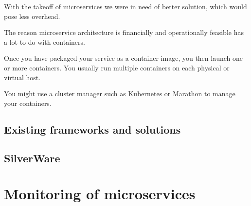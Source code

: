 \documentclass[12pt,oneside]{fithesis2}
\begin{document}
With the takeoff of microservices we were in need of better solution, which would pose less overhead.

The reason microservice architecture is financially and operationally feasible has a lot to do with containers.

Once you have packaged your service as a container image, you then launch one or more containers. You usually run multiple containers on each physical or virtual host.

You might use a cluster manager such as Kubernetes or Marathon to manage your containers.

\section{Existing frameworks and solutions}

\section{SilverWare}

\chapter{Monitoring of microservices}



\end{document}
